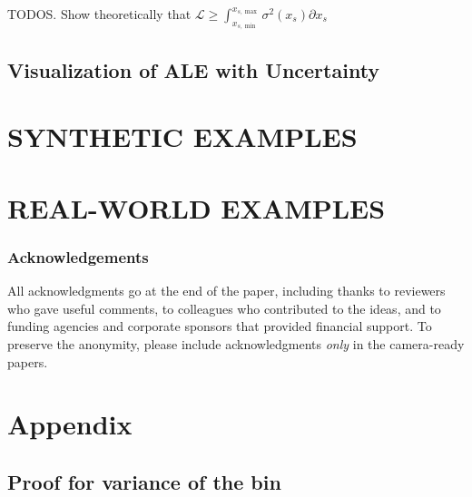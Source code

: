 \documentclass[twoside]{article}
\begin{document}
\noindent
TODOS. Show theoretically that \(\mathcal{L} \geq \int_{x_{s, \min}}^{x_{s, \max}}\sigma^2(x_s) \partial x_s\)




\subsection{Visualization of ALE with Uncertainty}

\section{SYNTHETIC EXAMPLES}

\section{REAL-WORLD EXAMPLES}


\subsubsection*{Acknowledgements}
All acknowledgments go at the end of the paper, including thanks to reviewers who gave useful comments, to colleagues who contributed to the ideas, and to funding agencies and corporate sponsors that provided financial support. 
To preserve the anonymity, please include acknowledgments \emph{only} in the camera-ready papers.




\section*{Appendix}

\subsection{Proof for variance of the bin}
\end{document}
